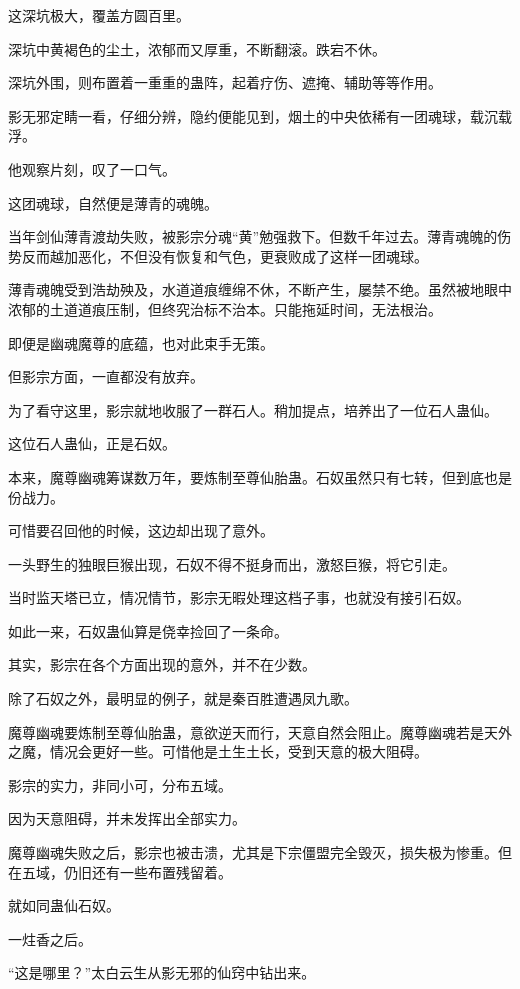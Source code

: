 \begin{this_body}
这深坑极大，覆盖方圆百里。

深坑中黄褐色的尘土，浓郁而又厚重，不断翻滚。跌宕不休。

深坑外围，则布置着一重重的蛊阵，起着疗伤、遮掩、辅助等等作用。

影无邪定睛一看，仔细分辨，隐约便能见到，烟土的中央依稀有一团魂球，载沉载浮。

他观察片刻，叹了一口气。

这团魂球，自然便是薄青的魂魄。

当年剑仙薄青渡劫失败，被影宗分魂“黄”勉强救下。但数千年过去。薄青魂魄的伤势反而越加恶化，不但没有恢复和气色，更衰败成了这样一团魂球。

薄青魂魄受到浩劫殃及，水道道痕缠绵不休，不断产生，屡禁不绝。虽然被地眼中浓郁的土道道痕压制，但终究治标不治本。只能拖延时间，无法根治。

即便是幽魂魔尊的底蕴，也对此束手无策。

但影宗方面，一直都没有放弃。

为了看守这里，影宗就地收服了一群石人。稍加提点，培养出了一位石人蛊仙。

这位石人蛊仙，正是石奴。

本来，魔尊幽魂筹谋数万年，要炼制至尊仙胎蛊。石奴虽然只有七转，但到底也是份战力。

可惜要召回他的时候，这边却出现了意外。

一头野生的独眼巨猴出现，石奴不得不挺身而出，激怒巨猴，将它引走。

当时监天塔已立，情况情节，影宗无暇处理这档子事，也就没有接引石奴。

如此一来，石奴蛊仙算是侥幸捡回了一条命。

其实，影宗在各个方面出现的意外，并不在少数。

除了石奴之外，最明显的例子，就是秦百胜遭遇凤九歌。

魔尊幽魂要炼制至尊仙胎蛊，意欲逆天而行，天意自然会阻止。魔尊幽魂若是天外之魔，情况会更好一些。可惜他是土生土长，受到天意的极大阻碍。

影宗的实力，非同小可，分布五域。

因为天意阻碍，并未发挥出全部实力。

魔尊幽魂失败之后，影宗也被击溃，尤其是下宗僵盟完全毁灭，损失极为惨重。但在五域，仍旧还有一些布置残留着。

就如同蛊仙石奴。

一炷香之后。

“这是哪里？”太白云生从影无邪的仙窍中钻出来。


\end{this_body}
